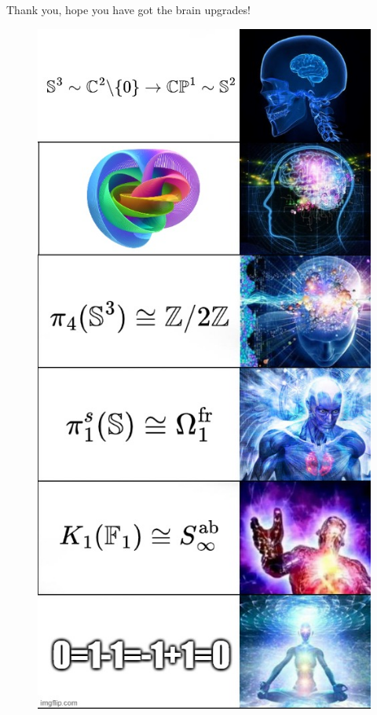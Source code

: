 \documentclass[12pt]{beamer}
\begin{document}
\begin{frame}{Thank you, hope you have got the brain upgrades!}
  
\begin{figure}
  \begin{center}
    \includegraphics[height=0.8\textheight]{figures/hopf_meme.jpg}
  \end{center}
\end{figure}

\end{frame}
\end{document}

